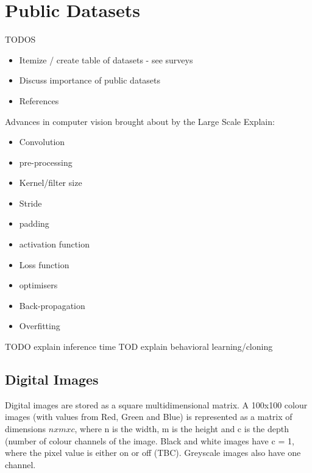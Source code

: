 \section{Public Datasets}

TODOS

\begin{itemize}
    \item Itemize / create table of datasets - see surveys
    \item Discuss importance of public datasets
    \item References
\end{itemize}

Advances in computer vision brought about by the Large Scale 
Explain:  
\begin{itemize}
    \item Convolution
    \item pre-processing
    \item Kernel/filter size
    \item Stride
    \item padding
    \item activation function
    \item Loss function
    \item optimisers
    \item Back-propagation
    \item Overfitting    
\end{itemize}

TODO explain inference time
TOD explain behavioral learning/cloning

\subsection{Digital Images}
Digital images are stored as a square multidimensional matrix. A 100x100 colour images (with values from Red, Green and Blue) is represented as a matrix of dimensions $n x m x c$, where n is the width, m is the height and c is the depth (number of colour channels of the image. Black and white images have c = 1, where the pixel value is either on or off (TBC). Greyscale images also have one channel.

